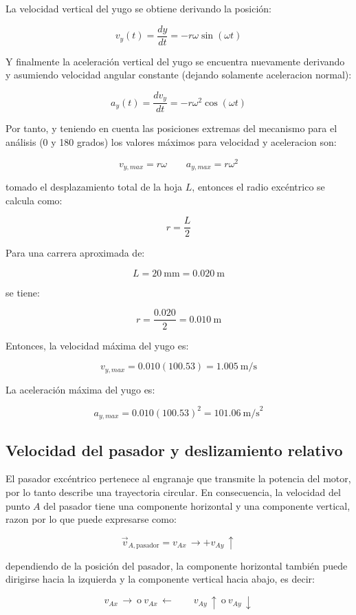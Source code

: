 \documentclass[12pt,letterpaper]{article}
\begin{document}
La velocidad vertical del yugo se obtiene derivando la posición:

\[
v_y(t)=\frac{dy}{dt}=-r\omega \sin(\omega t)
\]

Y finalmente la aceleración vertical del yugo se encuentra nuevamente derivando y asumiendo velocidad angular constante (dejando solamente aceleracion normal):

\[
a_y(t)=\frac{dv_y}{dt}=-r\omega^2\cos(\omega t)
\]

Por tanto, y teniendo en cuenta las posiciones extremas del mecanismo para el análisis (0 y 180 grados) los valores máximos para velocidad y aceleracion son:

\[
v_{y,max}=r\omega \qquad a_{y,max}=r\omega^2
\]

tomado el desplazamiento total de la hoja \(L\), entonces el radio excéntrico se calcula como:

\[
r=\frac{L}{2}
\]

Para una carrera aproximada de:

\[
L=20 \ \text{mm}=0.020 \ \text{m}
\]

se tiene:

\[
r=\frac{0.020}{2}=0.010 \ \text{m}
\]

Entonces, la velocidad máxima del yugo es:

\[
v_{y,max}=0.010(100.53)=1.005 \ \text{m/s}
\]

La aceleración máxima del yugo es:

\[
a_{y,max}=0.010(100.53)^2=101.06 \ \text{m/s}^2
\]

\subsection{Velocidad del pasador y deslizamiento relativo}

El pasador excéntrico pertenece al engranaje que transmite la potencia del motor, por lo tanto describe una trayectoria circular. En consecuencia, la velocidad del punto \(A\) del pasador tiene una componente horizontal y una componente vertical, razon por lo que puede expresarse como:

\[
\vec{v}_{A,\text{pasador}} = v_{Ax}\,\rightarrow + v_{Ay}\,\uparrow
\]

dependiendo de la posición del pasador, la componente horizontal también puede dirigirse hacia la izquierda y la componente vertical hacia abajo, es decir:

\[
v_{Ax}\,\rightarrow \ \text{o} \ v_{Ax}\,\leftarrow
\qquad
v_{Ay}\,\uparrow \ \text{o} \ v_{Ay}\,\downarrow
\]
\end{document}
